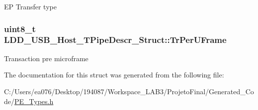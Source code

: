 E\-P Transfer type \hypertarget{struct_l_d_d___u_s_b___host___t_pipe_descr___struct_adb11454d0380a421cf7ab4fc225e5c41}{
\subsubsection[{Tr\-Per\-U\-Frame}]{\setlength{\rightskip}{0pt plus 5cm}uint8\-\_\-t L\-D\-D\-\_\-\-U\-S\-B\-\_\-\-Host\-\_\-\-T\-Pipe\-Descr\-\_\-\-Struct\-::\-Tr\-Per\-U\-Frame}}\label{struct_l_d_d___u_s_b___host___t_pipe_descr___struct_adb11454d0380a421cf7ab4fc225e5c41}
Transaction pre microframe 

The documentation for this struct was generated from the following file\-:\begin{DoxyCompactItemize}
\item 
C\-:/\-Users/ea076/\-Desktop/194087/\-Workspace\-\_\-\-L\-A\-B3/\-Projeto\-Final/\-Generated\-\_\-\-Code/\hyperlink{_p_e___types_8h}{P\-E\-\_\-\-Types.\-h}\end{DoxyCompactItemize}
